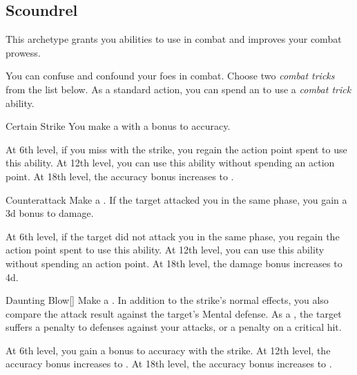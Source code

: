     \subsection{Scoundrel}
        This archetype grants you abilities to use in combat and improves your combat prowess.

        You can confuse and confound your foes in combat.
        Choose two \textit{combat tricks} from the list below.
        As a standard action, you can spend an  to use a \textit{combat trick} ability.
        {
            \begin{ability}{Certain Strike}
                You make a  with a  bonus to accuracy.

                At 6th level, if you miss with the strike, you regain the action point spent to use this ability.
                At 12th level, you can use this ability without spending an action point.
                At 18th level, the accuracy bonus increases to .
            \end{ability}

            \begin{ability}{Counterattack}
                Make a .
                If the target attacked you in the same phase, you gain a \plus3d bonus to damage.

                At 6th level, if the target did not attack you in the same phase, you regain the action point spent to use this ability.
                At 12th level, you can use this ability without spending an action point.
                At 18th level, the damage bonus increases to \plus4d.
            \end{ability}

            \begin{ability}{Daunting Blow}[]
                Make a .
                In addition to the strike's normal effects, you also compare the attack result against the target's Mental defense.
                As a , the target suffers a  penalty to defenses against your attacks, or a  penalty on a critical hit.

                At 6th level, you gain a  bonus to accuracy with the strike.
                At 12th level, the accuracy bonus increases to .
                At 18th level, the accuracy bonus increases to .
            \end{ability}

}

